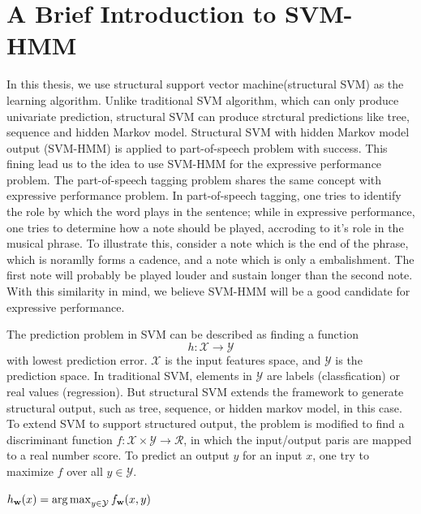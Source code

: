 \section{A Brief Introduction to SVM-HMM}
\label{sec:svm-hmm}
In this thesis, we use structural support vector machine(structural SVM) as the learning algorithm. Unlike traditional SVM algorithm, which can only produce univariate prediction, structural SVM can produce strctural predictions like tree, sequence and hidden Markov model. Structural SVM with hidden Markov model output (SVM-HMM) is applied to part-of-speech problem with success. This fining lead us to the idea to use SVM-HMM for the expressive performance problem. The part-of-speech tagging problem shares the same concept with expressive performance problem. In part-of-speech tagging, one tries to identify the role by which the word plays in the sentence; while in expressive performance,  one tries to determine how a note should be played, accroding to it's role in the musical phrase. To illustrate this, consider a note which is the end of the phrase, which is noramlly forms a cadence, and a note which is only a embalishment. The first note will probably be played louder and sustain longer than the second note. With this similarity in mind, we believe SVM-HMM will be a good candidate for expressive performance.


The prediction problem in SVM can be described  as finding a function 
$$h: \mathcal{X \rightarrow Y}$$ with lowest prediction error. $\mathcal{X}$ is the input features space, and $\mathcal{Y}$ is the prediction space. In traditional SVM, elements in $\mathcal{Y}$ are labels (classfication) or real values (regression). But structural SVM extends the framework to generate structural output, such as tree, sequence, or hidden markov model, in this case.
To extend SVM to support structured output, the problem is modified to find a discriminant function $f: \mathcal{X} \times \mathcal{Y} \rightarrow \mathcal{R}$, in which the input/output paris are mapped to a real number score. To predict an output $y$ for an input $x$, one try to maximize $f$ over all $y \in \mathcal{Y}$. 

$h_{\mathbf{w}}(x) = \operatorname*{arg\,max}_{y\in\mathcal{Y}} f_{\mathbf{w}}(x,y)$

